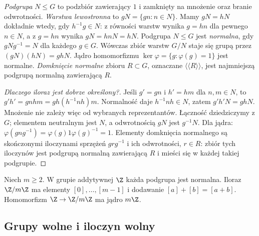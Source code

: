 \begin{definicja}
\label{def:normal-quotient-5}
\emph{Podgrupa} $N\leq G$ to podzbiór zawierający $1$
i zamknięty na mnożenie oraz branie odwrotności.
\emph{Warstwa lewostronna} to $gN=\{gn:n\in N\}$.
Mamy $gN=hN$ dokładnie wtedy, gdy $h^{-1}g\in N$:
z równości warstw wynika $g=hn$ dla pewnego $n\in N$,
a z $g=hn$ wynika $gN=hnN=hN$.
Podgrupa $N\leq G$ jest \emph{normalna},
gdy $gNg^{-1}=N$ dla każdego $g\in G$.
Wówczas zbiór warstw $G/N$ staje się
grupą przez $(gN)(hN)=ghN$.
Jądro homomorfizmu
$\ker\varphi=\{g:\varphi(g)=1\}$
jest normalne. \emph{Domknięcie normalne}
zbioru $R\subset G$, oznaczane
$\langle\!\langle R\rangle\!\rangle$,
jest najmniejszą podgrupą normalną
zawierającą $R$.
\end{definicja}

\begin{proof}[Dlaczego iloraz jest dobrze określony?]
Jeśli $g'=gn$ i $h'=hm$ dla $n,m\in N$,
to $g'h'=gnhm=gh(h^{-1}nh)m$.
Normalność daje $h^{-1}nh\in N$,
zatem $g'h'N=ghN$. Mnożenie
nie zależy więc od wybranych
reprezentantów. Łączność dziedziczymy z $G$;
elementem neutralnym jest $N$, a odwrotnością $gN$ jest $g^{-1}N$.
Dla jądra:
$\varphi(gng^{-1})=
\varphi(g)1\varphi(g)^{-1}=1$.
Elementy domknięcia normalnego
są skończonymi iloczynami
sprzężeń $grg^{-1}$ i ich
odwrotności, $r\in R$:
zbiór tych iloczynów jest
podgrupą normalną zawierającą
$R$ i mieści się w każdej takiej
podgrupie.
\end{proof}

\begin{przyklad}
\label{prz:Zmodm-grupa-5}
Niech $m\geq2$.
W grupie addytywnej $\Z$ każda
podgrupa jest normalna.
Iloraz $\Z/m\Z$ ma elementy
$[0],\ldots,[m-1]$ i dodawanie
$[a]+[b]=[a+b]$. Homomorfizm
$\Z\to\Z/m\Z$ ma jądro $m\Z$.
\end{przyklad}

\subsection*{Grupy wolne i iloczyn wolny}

